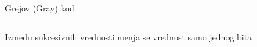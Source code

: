 \begin{frame}[label=06-s017]{Grejov (Gray) kod}
\vspace{1.5mm}
\fontsize{10}{12}\selectfont\begin{columns}[c,onlytextwidth]
Između sukcesivnih vrednosti menja se vrednost samo jednog bita
\centering\renewcommand{\arraystretch}{.96}\fontsize{9}{10}\selectfont\setlength{\tabcolsep}{7pt}
\end{columns}
\end{frame}
